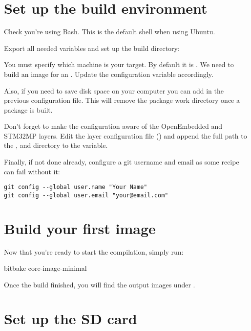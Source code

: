 \section{Set up the build environment}

Check you're using Bash. This is the default shell when using Ubuntu.

Export all needed variables and set up the build directory:

You must specify which machine is your target. By default it
is . We need to build an image for an .
Update the  configuration variable accordingly.

Also, if you need to save disk space on your computer you can add  in the previous configuration file. This will remove the
package work directory once a package is built.

Don't forget to make the configuration aware of the OpenEmbedded and
STM32MP layers. Edit the layer configuration file
() and append the full path to the
,  and  directory to the
 variable.

Finally, if not done already, configure a git username and email as some recipe
can fail without it:
\begin{verbatim}
git config --global user.name "Your Name"
git config --global user.email "your@email.com"
\end{verbatim}

\section{Build your first image}

Now that you're ready to start the compilation, simply run:
\begin{bashinput}
bitbake core-image-minimal
\end{bashinput}

Once the build finished, you will find the output images under
.

\section{Set up the SD card}

